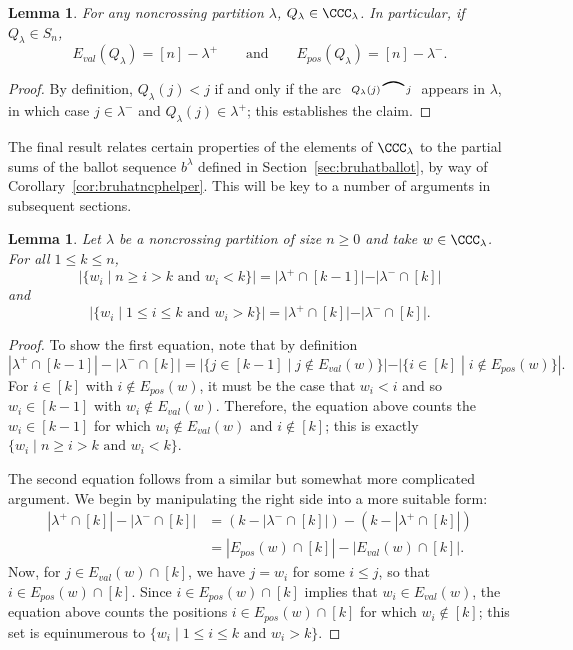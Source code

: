 \documentclass[12pt]{article}
\newtheorem{lem}[equation]{Lemma}
\theoremstyle{definition}
\theoremstyle{remark}
\numberwithin{equation}{section}
\renewcommand{\setminus}{-}
\newcommand{\EP}{E_{pos}}
\newcommand{\EV}{E_{val}}
\newcommand{\edge}[2]{\tikz[scale = 0.75, baseline = -0.2cm]{
\draw (0.1, 0) node[inner sep = 0ex] (a) {};
\node[left, xshift = 0.1cm, yshift = -0.1cm] at (a) {$\scriptstyle #1$};
\draw (0.9, 0)  node[inner sep = 0ex] (b) {};
\node[right, xshift = -0.1cm, yshift = -0.1cm] at (b) {$\scriptstyle #2$};
\draw[thick] (a) to[out = 35, in = 145] (b);}}
\begin{document}
\begin{lem}
\label{lem:QSVexcedance}
For any noncrossing partition $\lambda$, $Q_{\lambda} \in \CCC_{\lambda}$.  In particular, if $Q_{\lambda} \in S_{n}$, 
\[
\EV(Q_{\lambda}) = [n] \setminus \lambda^{+}
\qquad\text{and}\qquad
\EP(Q_{\lambda}) = [n] \setminus \lambda^{-}.
\]
\end{lem}
\begin{proof}
By definition, $Q_{\lambda}(j) < j$ if and only if the arc $ \edge{Q_{\lambda}(j)}{j}$ appears in $\lambda$, in which case $j \in \lambda^{-}$ and $Q_{\lambda}(j) \in \lambda^{+}$; this establishes the claim.
\end{proof}

The final result relates certain properties of the elements of $\CCC_{\lambda}$ to the partial sums of the ballot sequence $b^{\lambda}$ defined in Section~\ref{sec:bruhatballot}, by way of Corollary~\ref{cor:bruhatncphelper}.  This will be key to a number of arguments in subsequent sections.


\begin{lem}
\label{lem:tableautobruhat}
Let $\lambda$ be a noncrossing partition of size $n \ge 0$ and take $w \in \CCC_{\lambda}$.  For all $1 \le k \le n$, 
\[
|\{ w_{i} \;|\; \text{$n \ge i > k$ and $w_{i} < k$}\}|
= |\lambda^{+} \cap [k-1]| - |\lambda^{-} \cap [k]|
\]
and 
\[
|\{ w_{i} \;|\; \text{$1 \le i \le k$ and $w_{i} > k$}\}|
= |\lambda^{+} \cap [k]| - |\lambda^{-} \cap [k] |.
\]
\end{lem}
\begin{proof}
To show the first equation, note that by definition
\[
|\lambda^{+} \cap [k-1]| - |\lambda^{-} \cap [k]| = |\{j \in [k-1] \;|\; j \notin \EV(w)\}| - |\{i \in [k] \;|\; i \notin \EP(w)\}|.
\]
For $i \in [k]$ with $i \notin \EP(w)$, it must be the case that $w_{i} < i$ and so $w_{i} \in [k-1]$ with $w_{i} \notin \EV(w)$.  
Therefore, the equation above counts the $w_{i} \in [k-1]$ for which $w_{i} \notin \EV(w)$ and $i \notin [k]$; this is exactly $\{ w_{i} \;|\; \text{$n \ge i > k$ and $w_{i} < k$}\}$.

The second equation follows from a similar but somewhat more complicated argument.  We begin by manipulating the right side into a more suitable form:
\begin{align*}
|\lambda^{+} \cap [k]| - |\lambda^{-} \cap [k] | &=  (k - |\lambda^{-} \cap [k] |) - (k - |\lambda^{+} \cap [k]|) \\
&= |\EP(w) \cap [k]| - |\EV(w) \cap [k]|.
\end{align*}
Now, for $j \in \EV(w) \cap [k]$, we have $j = w_{i}$ for some $i \le j$, so that $i \in \EP(w) \cap [k]$.  Since $i \in \EP(w) \cap [k]$ implies that $w_{i} \in \EV(w)$, the equation above counts the positions $i \in \EP(w) \cap [k]$ for which $w_{i} \notin [k]$; this set is equinumerous to $\{ w_{i} \;|\; \text{$1 \le i \le k$ and $w_{i} > k$}\}$.
\end{proof}
\end{document}
